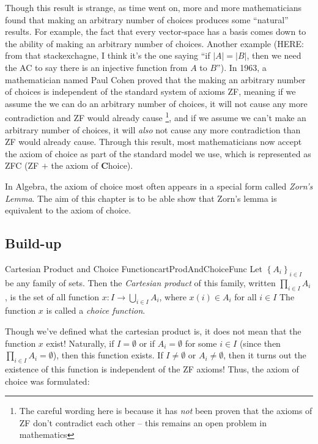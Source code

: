 \documentclass[oneside]{book}
\newcommand{\rw}{\rightarrow}
\begin{document}
Though this result is strange, as time went on, more and more mathematicians found that making an arbitrary number of
choices produces some ``natural'' results. For example, the fact that every vector-space has a basis comes down to
the ability of making an arbitrary number of choices. Another example (HERE: from that stackexchagne, I think it's the
one saying ``if $|A| = |B|$, then we need the AC to say there is an injective function from $A$ to $B$''). In 1963,
a mathematician named Paul Cohen proved that the making an arbitrary number of choices is independent of the standard
system of axioms ZF, meaning if we assume the we can do an arbitrary number of choices, it will not cause any more
contradiction and ZF would already cause \footnote{The careful wording here is because it has \emph{not} been proven
that the axioms of ZF don't contradict each other -- this remains an open problem in mathematics}, and if we assume we
can't make an arbitrary number of choices, it will \emph{also} not cause any more contradiction than ZF would already
cause. Through this result, most mathematicians now accept the axiom of choice as part of the standard model we use,
which is represented as ZFC (ZF $+$ the axiom of \textbf{C}hoice).

In Algebra, the axiom of choice most often appears in a special form called \emph{Zorn's Lemma}. The aim of this chapter
is to be able show that Zorn's lemma is equivalent to the axiom of choice.
\subsection{Build-up}


\begin{defn}{Cartesian Product and Choice Function}{cartProdAndChoiceFunc}
	Let $\left\{ A_i \right\}_{i \in I}$ be any family of sets. Then the \emph{Cartesian product} of this family,
	written $\prod_{i \in I}A_i$, is the set of all function $x: I \rw \bigcup_{i \in I} A_i$, where $x(i) \in A_i$ for
	all $i \in I$ The function $x$ is called a \emph{choice function}.
\end{defn}

Though we've defined what the cartesian product is, it does not mean that the function $x$ exist! Naturally, if $I
= \emptyset$ or if $A_i = \emptyset$ for some $i \in I$ (since then $\prod_{i \in I}A_i = \emptyset$), then this function exists. If $I \ne \emptyset$ or $A_i \ne
\emptyset$, then it turns out the existence of this function is independent of the ZF axioms! Thus, the axiom of choice
was formulated:
\end{document}
